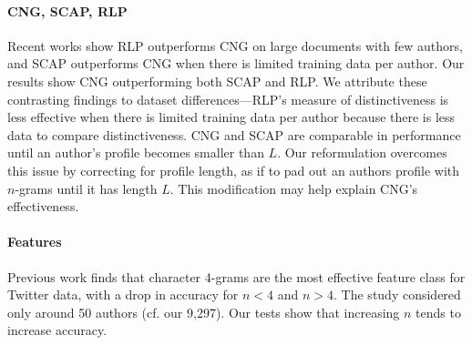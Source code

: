 \documentclass[twocolumn,10pt]{article}
\begin{document}
\paragraph{CNG, SCAP, RLP} Recent works show RLP outperforms CNG on large documents with few authors\supercite{layton2012recentred}, and SCAP outperforms CNG when there is limited training data per author\supercite{frantzeskou2006effective}. Our results show CNG outperforming both SCAP and RLP. We attribute these contrasting findings to dataset differences---RLP's measure of distinctiveness is %
less effective when there is limited training data per author because there is less data to compare distinctiveness. %
CNG and SCAP are comparable in performance until an author's profile becomes smaller than $L$\supercite{frantzeskou2006effective}.
Our reformulation overcomes this issue by correcting for profile length, as if to pad out an authors profile with $n$-grams until it has length $L$.
This modification may help explain CNG's effectiveness.

\paragraph{Features}
Previous work\supercite{layton2010authorship} finds that character 4-grams
are the most effective feature class for Twitter data, with a drop in
accuracy for $n<4$ and $n>4$.
The study considered only around 50 authors (cf. our 9,297). 
Our tests show that increasing $n$ tends to increase accuracy. 
\end{document}
